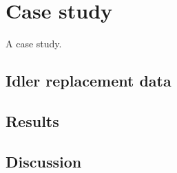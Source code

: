 \chapter{Case study}\label{chap:chapter4}

A case study.

\section{Idler replacement data}

\section{Results}

\section{Discussion}
